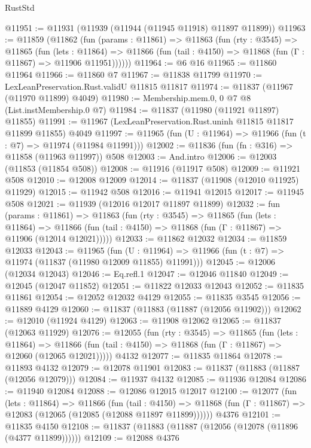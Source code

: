 \begin{lexlean}{RustStd}
\begin{coremodule}
{\begin{coremodule}
{{{{{{{{{{{{{{{{{{{{{{{{{{{{{{{{{{{{{{{{{{{{{{{{{{@11951 := @11931 (@11939 (@11944 (@11945 @11918) @11897 @11899))
@11963 := @11859
    (@11862
      (fun (params : @11861) =>
      @11863
        (fun (rty : @3545) =>
        @11865
          (fun (lets : @11864) =>
          @11866 (fun (tail : @4150) => @11868 (fun (Γ : @11867) => @11906 @11951))))))
@11964 := @6 @16
@11965 := @11860 @11964
@11966 := @11860 @7
@11967 := @11838 @11799
@11970 := LexLeanPreservation.Rust.validU @11815 @11817
@11974 := @11837 (@11967 (@11970 @11899) @4049)
@11980 := Membership.mem.{0, 0} @7 @8 (List.instMembership.{0} @7)
@11984 := @11837 (@11980 (@11921 @11897) @11855)
@11991 := @11967 (LexLeanPreservation.Rust.uninh @11815 @11817 @11899 @11855) @4049
@11997 := @11965 (fun (U : @11964) => @11966 (fun (t : @7) => @11974 (@11984 @11991)))
@12002 := @11836 (fun (fn : @316) => @11858 (@11963 @11997)) @508
@12003 := And.intro
@12006 := @12003 (@11853 (@11854 @508))
@12008 := @11916 (@11917 @508)
@12009 := @11921 @508
@12010 := @12008 @12009
@12014 := @11837 (@11908 (@12010 @11925) @11929)
@12015 := @11942 @508
@12016 := @11941 @12015
@12017 := @11945 @508
@12021 := @11939 (@12016 @12017 @11897 @11899)
@12032 := fun (params : @11861) =>
  @11863
    (fun (rty : @3545) =>
    @11865
      (fun (lets : @11864) =>
      @11866 (fun (tail : @4150) => @11868 (fun (Γ : @11867) => @11906 (@12014 @12021)))))
@12033 := @11862 @12032
@12034 := @11859 @12033
@12043 := @11965
    (fun (U : @11964) => @11966 (fun (t : @7) => @11974 (@11837 (@11980 @12009 @11855) @11991)))
@12045 := @12006 (@12034 @12043)
@12046 := Eq.refl.{1}
@12047 := @12046 @11840
@12049 := @12045 (@12047 @11852)
@12051 := @11822 @12033 @12043
@12052 := @11835 @11861
@12054 := @12052 @12032 @4129
@12055 := @11835 @3545
@12056 := @11889 @4129
@12060 := @11837 (@11883 (@11887 (@12056 @11902)))
@12062 := @12010 (@11924 @4129)
@12063 := @11908 @12062
@12065 := @11837 (@12063 @11929)
@12076 := @12055
    (fun (rty : @3545) =>
    @11865
      (fun (lets : @11864) =>
      @11866 (fun (tail : @4150) => @11868 (fun (Γ : @11867) => @12060 (@12065 @12021)))))
    @4132
@12077 := @11835 @11864
@12078 := @11893 @4132
@12079 := @12078 @11901
@12083 := @11837 (@11883 (@11887 (@12056 @12079)))
@12084 := @11937 @4132
@12085 := @11936 @12084
@12086 := @11940 @12084
@12088 := @12086 @12015 @12017
@12100 := @12077
    (fun (lets : @11864) =>
    @11866
      (fun (tail : @4150) =>
      @11868 (fun (Γ : @11867) => @12083 (@12065 (@12085 (@12088 @11897 @11899))))))
    @4376
@12101 := @11835 @4150
@12108 := @11837 (@11883 (@11887 (@12056 (@12078 (@11896 (@4377 @11899))))))
@12109 := @12088 @4376
}}}}}}}}}}}}}}}}}}}}}}}}}}}}}}}}}}}}}}}}}}}}}}}}}}
\end{coremodule}}
\end{coremodule}
\end{lexlean}
